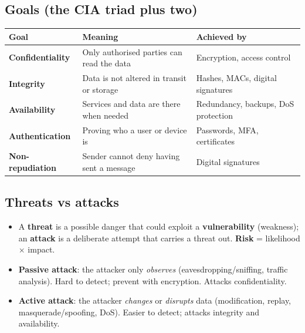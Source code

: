 \documentclass[10pt]{article}
\begin{document}
\subsection{Goals (the CIA triad plus two)}
\begin{tabularx}{\linewidth}{@{}>{\bfseries}lXl@{}}
\toprule
Goal & Meaning & Achieved by\\\midrule
Confidentiality & Only authorised parties can read the data & Encryption, access control\\
Integrity & Data is not altered in transit or storage & Hashes, MACs, digital signatures\\
Availability & Services and data are there when needed & Redundancy, backups, DoS protection\\
Authentication & Proving who a user or device is & Passwords, MFA, certificates\\
Non-repudiation & Sender cannot deny having sent a message & Digital signatures\\
\bottomrule
\end{tabularx}

\subsection{Threats vs attacks}
\begin{itemize}
\item A \textbf{threat} is a possible danger that could exploit a \textbf{vulnerability} (weakness); an \textbf{attack} is a deliberate attempt that carries a threat out. \textbf{Risk} = likelihood $\times$ impact.
\item \textbf{Passive attack}: the attacker only \emph{observes} (eavesdropping/sniffing, traffic analysis). Hard to detect; prevent with encryption. Attacks confidentiality.
\item \textbf{Active attack}: the attacker \emph{changes} or \emph{disrupts} data (modification, replay, masquerade/spoofing, DoS). Easier to detect; attacks integrity and availability.
\end{itemize}
\end{document}
